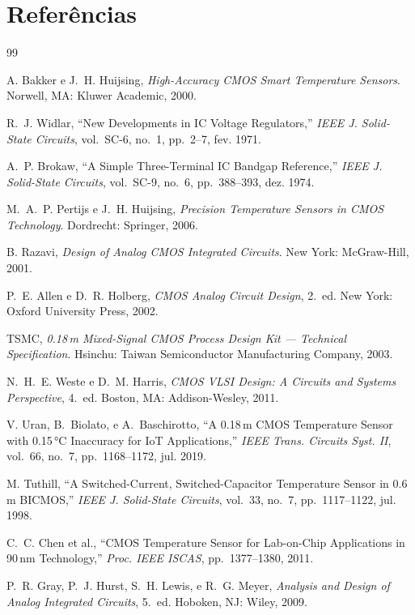 \documentclass[12pt,a4paper]{article}
\begin{document}
\section*{Referências}

\begin{thebibliography}{99}

  A. Bakker e J.~H. Huijsing,
  \textit{High-Accuracy CMOS Smart Temperature Sensors}.
  Norwell, MA: Kluwer Academic, 2000.

  R.~J. Widlar,
  ``New Developments in IC Voltage Regulators,''
  \textit{IEEE J. Solid-State Circuits}, vol.~SC-6, no.~1, pp.~2--7, fev. 1971.

  A.~P. Brokaw,
  ``A Simple Three-Terminal IC Bandgap Reference,''
  \textit{IEEE J. Solid-State Circuits}, vol.~SC-9, no.~6, pp.~388--393, dez. 1974.

  M.~A.~P. Pertijs e J.~H. Huijsing,
  \textit{Precision Temperature Sensors in CMOS Technology}.
  Dordrecht: Springer, 2006.

  B. Razavi,
  \textit{Design of Analog CMOS Integrated Circuits}.
  New York: McGraw-Hill, 2001.

  P.~E. Allen e D.~R. Holberg,
  \textit{CMOS Analog Circuit Design}, 2.~ed.
  New York: Oxford University Press, 2002.

  TSMC,
  \textit{0.18\,\textmu m Mixed-Signal CMOS Process Design Kit --- Technical Specification}.
  Hsinchu: Taiwan Semiconductor Manufacturing Company, 2003.

  N.~H.~E. Weste e D.~M. Harris,
  \textit{CMOS VLSI Design: A Circuits and Systems Perspective}, 4.~ed.
  Boston, MA: Addison-Wesley, 2011.

  V. Uran, B.~Biolato, e A.~Baschirotto,
  ``A 0.18\,\textmu m CMOS Temperature Sensor with 0.15\,°C Inaccuracy for IoT Applications,''
  \textit{IEEE Trans. Circuits Syst. II}, vol.~66, no.~7, pp.~1168--1172, jul. 2019.

  M. Tuthill,
  ``A Switched-Current, Switched-Capacitor Temperature Sensor in 0.6\,\textmu m BICMOS,''
  \textit{IEEE J. Solid-State Circuits}, vol.~33, no.~7, pp.~1117--1122, jul. 1998.

  C.~C. Chen et al.,
  ``CMOS Temperature Sensor for Lab-on-Chip Applications in 90\,nm Technology,''
  \textit{Proc. IEEE ISCAS}, pp.~1377--1380, 2011.

  P.~R. Gray, P.~J. Hurst, S.~H. Lewis, e R.~G. Meyer,
  \textit{Analysis and Design of Analog Integrated Circuits}, 5.~ed.
  Hoboken, NJ: Wiley, 2009.

\end{thebibliography}
\end{document}
